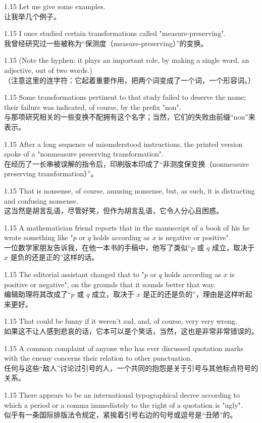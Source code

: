 \documentclass[12pt,a4paper]{article}
\newcommand{\bilingual}[2]{
    \begin{spacing}{1.15} %
        \noindent \normalsize #1 \\[-0.5ex] %
        \small \textcolor{blue!70!black}{#2} %
    \end{spacing}
    \vspace{0.8em} %
}
\begin{document}
\bilingual{Let me give some examples.}
{让我举几个例子。} %

\bilingual{I once studied certain transformations called "measure-preserving".}
{我曾经研究过一些被称为“保测度（measure-preserving）”的变换。} %

\bilingual{(Note the hyphen: it plays an important role, by making a single word, an adjective, out of two words.)}
{（注意这里的连字符：它起着重要作用，把两个词变成了一个词，一个形容词。）} %

\bilingual{Some transformations pertinent to that study failed to deserve the name; their failure was indicated, of course, by the prefix "non".}
{与那项研究相关的一些变换不配拥有这个名字；当然，它们的失败由前缀“non”来表示。} %

\bilingual{After a long sequence of misunderstood instructions, the printed version spoke of a "nonmeasure preserving transformation".}
{在经历了一长串被误解的指令后，印刷版本印成了“非测度保变换（nonmeasure preserving transformation）”。} %

\bilingual{That is nonsense, of course, amusing nonsense, but, as such, it is distracting and confusing nonsense.}
{这当然是胡言乱语，尽管好笑，但作为胡言乱语，它令人分心且困惑。} %

\bilingual{A mathematician friend reports that in the manuscript of a book of his he wrote something like "$p$ or $q$ holds according as $x$ is negative or positive".}
{一位数学家朋友告诉我，在他一本书的手稿中，他写了类似“$p$ 或 $q$ 成立，取决于 $x$ 是负的还是正的”这样的话。} %

\bilingual{The editorial assistant changed that to "$p$ or $q$ holds according as $x$ is positive or negative", on the grounds that it sounds better that way.}
{编辑助理将其改成了“$p$ 或 $q$ 成立，取决于 $x$ 是正的还是负的”，理由是这样听起来更好。} %

\bilingual{That could be funny if it weren't sad, and, of course, very very wrong.}
{如果这不让人感到悲哀的话，它本可以是个笑话，当然，这也是非常非常错误的。} %

\bilingual{A common complaint of anyone who has ever discussed quotation marks with the enemy concerns their relation to other punctuation.}
{任何与这些“敌人”讨论过引号的人，一个共同的抱怨是关于引号与其他标点符号的关系。} %

\bilingual{There appears to be an international typographical decree according to which a period or a comma immediately to the right of a quotation is "ugly".}
{似乎有一条国际排版法令规定，紧挨着引号右边的句号或逗号是“丑陋”的。} %
\end{document}
